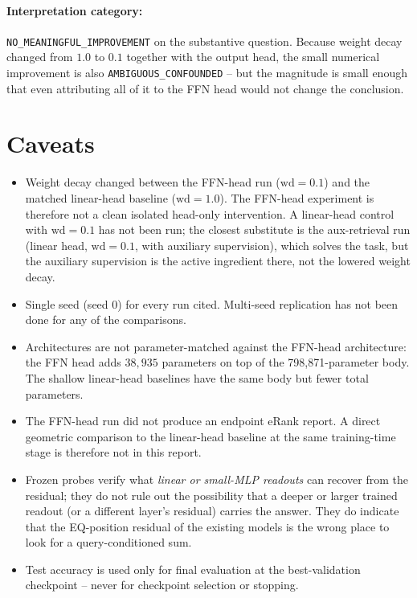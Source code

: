 \documentclass[10pt]{article}
\begin{document}
\paragraph{Interpretation category:}
\texttt{NO\_MEANINGFUL\_IMPROVEMENT} on the substantive question. Because weight decay changed from $1.0$ to $0.1$ together with the output head, the small numerical improvement is also \texttt{AMBIGUOUS\_CONFOUNDED} -- but the magnitude is small enough that even attributing all of it to the FFN head would not change the conclusion.

\section{Caveats}

\begin{itemize}
\item Weight decay changed between the FFN-head run ($\mathrm{wd}=0.1$) and the matched linear-head baseline ($\mathrm{wd}=1.0$). The FFN-head experiment is therefore not a clean isolated head-only intervention. A linear-head control with $\mathrm{wd}=0.1$ has not been run; the closest substitute is the aux-retrieval run (linear head, $\mathrm{wd}=0.1$, with auxiliary supervision), which solves the task, but the auxiliary supervision is the active ingredient there, not the lowered weight decay.
\item Single seed (seed 0) for every run cited. Multi-seed replication has not been done for any of the comparisons.
\item Architectures are not parameter-matched against the FFN-head architecture: the FFN head adds $38{,}935$ parameters on top of the 798{,}871-parameter body. The shallow linear-head baselines have the same body but fewer total parameters.
\item The FFN-head run did not produce an endpoint eRank report. A direct geometric comparison to the linear-head baseline at the same training-time stage is therefore not in this report.
\item Frozen probes verify what \emph{linear or small-MLP readouts} can recover from the residual; they do not rule out the possibility that a deeper or larger trained readout (or a different layer's residual) carries the answer. They do indicate that the EQ-position residual of the existing models is the wrong place to look for a query-conditioned sum.
\item Test accuracy is used only for final evaluation at the best-validation checkpoint -- never for checkpoint selection or stopping.
\end{itemize}
\end{document}
